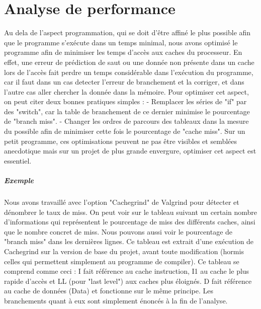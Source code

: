 \documentclass{report}
\begin{document}
\chapter{Analyse de performance}
Au dela de l'aspect programmation, qui se doit d'être affiné le plus possible afin que le programme s’exécute dans un temps minimal, nous avons optimisé le programme afin de minimiser les temps d'accès aux caches du processeur.
En effet, une erreur de prédiction de saut ou une donnée non présente dans un cache lors de l’accès fait perdre un temps considérable dans l'exécution du programme, car il faut dans un cas detecter l'erreur de branchement et la corriger, et dans l'autre cas aller chercher la donnée dans la mémoire.
Pour optimiser cet aspect, on peut citer deux bonnes pratiques simples : 
\newline
- Remplacer les séries de "if" par des "switch", car la table de branchement de ce dernier minimise le pourcentage de "branch miss". 
\newline
- Changer les ordres de parcours des tableaux dans la mesure du possible afin de minimiser cette fois le pourcentage de "cache miss".
\newline
Sur un petit programme, ces optimisations peuvent ne pas être visibles et semblées anecdotique mais sur un projet de plus grande envergure, optimiser cet aspect est essentiel.

\paragraph{Exemple}
Nous avons travaillé avec l'option "Cachegrind" de Valgrind pour détecter et dénombrer le taux de miss.
On peut voir sur le tableau suivant un certain nombre d'informations qui représentent le pourcentage de miss des différents caches, ainsi que le nombre concret de miss. 
Nous pouvons aussi voir le pourcentage de "branch miss" dans les dernières lignes. 
Ce tableau est extrait d'une exécution de Cachegrind sur la version de base du projet, avant toute modification (hormis celles qui permettent simplement au programme de compiler).
Ce tableau se comprend comme ceci :
\newline
I fait référence au cache instruction, I1 au cache le plus rapide d'accès et LL (pour "last level") aux caches plus éloignés.
\newline
D fait référence au cache de données (Data) et fonctionne sur le même principe.
Les branchements quant à eux sont simplement énoncés à la fin de l'analyse.
\end{document}

